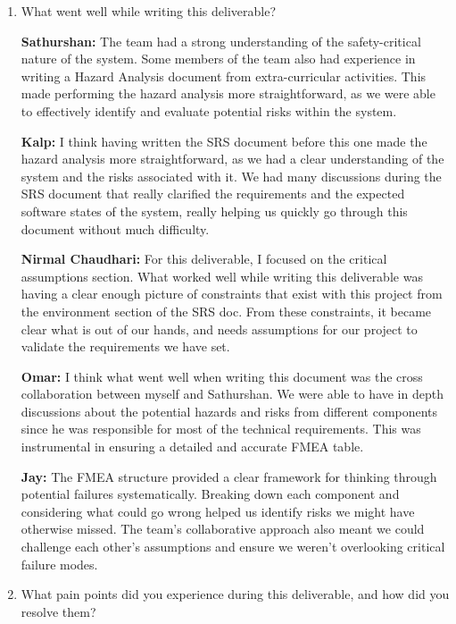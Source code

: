 \documentclass{article}
\begin{document}
\begin{enumerate}
    \item What went well while writing this deliverable? 
    
    \textbf{Sathurshan:} The team had a strong understanding of the
    safety-critical nature of the system. Some members of the team also had
    experience in writing a Hazard Analysis document from extra-curricular
    activities. This made performing the hazard analysis more straightforward,
    as we were able to effectively identify and evaluate potential risks within
    the system.

    \textbf{Kalp:} I think having written the SRS document before this one made
    the hazard analysis more straightforward, as we had a clear understanding of
    the system and the risks associated with it. We had many discussions during
    the SRS document that really clarified the requirements and the expected
    software states of the system, really helping us quickly go through this
    document without much difficulty.
    
    \textbf{Nirmal Chaudhari:} For this deliverable, I focused on the critical
    assumptions section. What worked well while writing this deliverable was
    having a clear enough picture of constraints that exist with this project
    from the environment section of the SRS doc. From these constraints, it
    became clear what is out of our hands, and needs assumptions for our project
    to validate the requirements we have set. 

    
    \textbf{Omar:} I think what went well when writing this document was the
    cross collaboration between myself and Sathurshan. We were able to have in
    depth discussions about the potential hazards and risks from different
    components since he was responsible for most of the technical requirements.
    This was instrumental in ensuring a detailed and accurate FMEA table.

    \textbf{Jay:} The FMEA structure provided a clear framework for thinking
    through potential failures systematically. Breaking down each component and
    considering what could go wrong helped us identify risks we might have
    otherwise missed. The team's collaborative approach also meant we could
    challenge each other's assumptions and ensure we weren't overlooking
    critical failure modes.

    \item What pain points did you experience during this deliverable, and how
    did you resolve them?


\end{enumerate}
\end{document}
